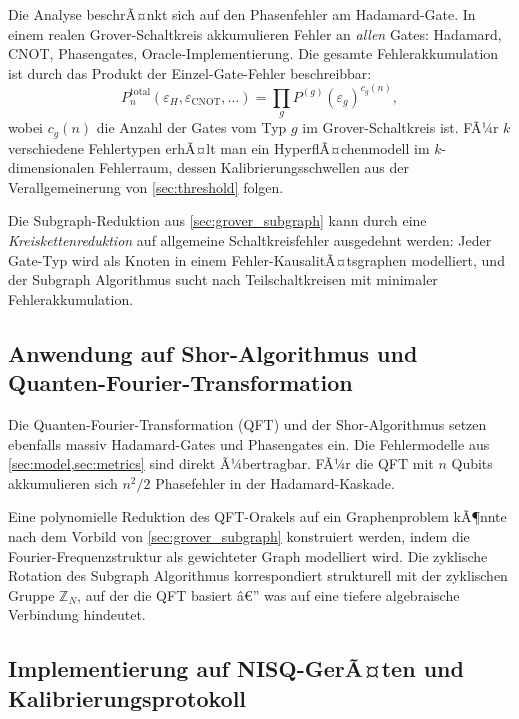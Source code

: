 ﻿\documentclass[11pt,a4paper]{article}
\theoremstyle{definition}
\begin{document}
Die Analyse beschrÃ¤nkt sich auf den Phasenfehler am Hadamard-Gate.  In einem
realen Grover-Schaltkreis akkumulieren Fehler an \emph{allen} Gates:
Hadamard, CNOT, Phasengates, Oracle-Implementierung.  Die gesamte
Fehlerakkumulation ist durch das Produkt der Einzel-Gate-Fehler beschreibbar:
\begin{equation}
  P_n^{\mathrm{total}}(\varepsilon_H, \varepsilon_{\mathrm{CNOT}}, \ldots)
  = \prod_{g} P^{(g)}(\varepsilon_g)^{c_g(n)},
\end{equation}
wobei $c_g(n)$ die Anzahl der Gates vom Typ $g$ im Grover-Schaltkreis ist.
FÃ¼r $k$ verschiedene Fehlertypen erhÃ¤lt man ein HyperflÃ¤chenmodell im
$k$-dimensionalen Fehlerraum, dessen Kalibrierungsschwellen aus der
Verallgemeinerung von \cref{sec:threshold} folgen.

Die Subgraph-Reduktion aus \cref{sec:grover_subgraph} kann durch eine
\emph{Kreiskettenreduktion} auf allgemeine Schaltkreisfehler ausgedehnt werden:
Jeder Gate-Typ wird als Knoten in einem Fehler-KausalitÃ¤tsgraphen modelliert,
und der Subgraph Algorithmus sucht nach Teilschaltkreisen mit minimaler
Fehlerakkumulation.

\subsection{Anwendung auf Shor-Algorithmus und Quanten-Fourier-Transformation}
\label{subsec:outlook_shor}

Die Quanten-Fourier-Transformation (QFT) \cite{Coppersmith1994} und der
Shor-Algorithmus \cite{Shor1994} setzen ebenfalls massiv Hadamard-Gates
und Phasengates ein.  Die Fehlermodelle aus \cref{sec:model,sec:metrics}
sind direkt Ã¼bertragbar.  FÃ¼r die QFT mit $n$ Qubits akkumulieren sich
$n^2/2$ Phasefehler in der Hadamard-Kaskade.

Eine polynomielle Reduktion des QFT-Orakels auf ein Graphenproblem kÃ¶nnte
nach dem Vorbild von \cref{sec:grover_subgraph} konstruiert werden,
indem die Fourier-Frequenzstruktur als gewichteter Graph modelliert wird.
Die zyklische Rotation des Subgraph Algorithmus \cite{Epp2026} korrespondiert
strukturell mit der zyklischen Gruppe $\mathbb{Z}_N$, auf der die QFT basiert â€”
was auf eine tiefere algebraische Verbindung hindeutet.

\subsection{Implementierung auf NISQ-GerÃ¤ten und Kalibrierungsprotokoll}
\label{subsec:outlook_nisq}
\end{document}
